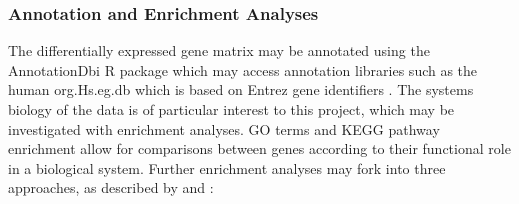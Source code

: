 
\subsubsection{Annotation and Enrichment Analyses}

The differentially expressed gene matrix may be annotated using the AnnotationDbi \citep{annotationdbi} R package which may access annotation libraries such as the human org.Hs.eg.db \citep{org.Hs.eg.db} which is based on Entrez gene identifiers \citep{maglott2005entrez}. The systems biology of the data is of particular interest to this project, which may be investigated with enrichment analyses. %
\ac{GO} terms and \ac{KEGG} \citep{kanehisa2017kegg} pathway enrichment allow for comparisons between genes according to their functional role in a biological system. Further enrichment analyses may fork into three approaches, as described by \citep{khatri2012ten} and \cite{alhamdoosh2017combining}:

